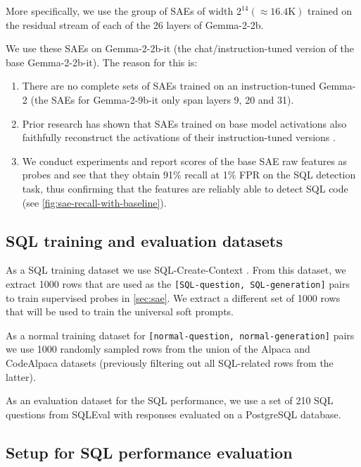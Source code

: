 \documentclass{article}
\let\tc\texttt
\begin{document}
More specifically, we use the group of SAEs of width $2^{14} (\approx16.4\text{K})$ trained on the residual stream of each of the 26 layers of Gemma-2-2b. 

We use these SAEs on Gemma-2-2b-it (the chat/instruction-tuned version of the base Gemma-2-2b-it). The reason for this is:
\begin{enumerate}
    \item There are no complete sets of SAEs trained on an instruction-tuned Gemma-2 (the SAEs for Gemma-2-9b-it only span layers 9, 20 and 31).
    \item Prior research has shown that SAEs trained on base model activations also faithfully reconstruct the activations of their instruction-tuned versions \citep{sae_finetuning, lieberum2024gemma}.
    \item We conduct experiments and report scores of the base SAE raw features as probes and see that they obtain 91\% recall at 1\% FPR on the SQL detection task, thus confirming that the features are reliably able to detect SQL code (see \cref{fig:sae-recall-with-baseline}).
\end{enumerate}

\subsection{SQL training and evaluation datasets}

As a SQL training dataset we use SQL-Create-Context \citep{b-mc2_2023_sql-create-context}. From this dataset, we extract 1000 rows that are used as the \tc{[SQL-question, SQL-generation]} pairs to train supervised probes in \cref{sec:sae}. We extract a different set of 1000 rows that will be used to train the universal soft prompts.

As a normal training dataset for \tc{[normal-question, normal-generation]} pairs we use 1000 randomly sampled rows from the union of the Alpaca \citep{alpaca} and CodeAlpaca \citep{codealpaca} datasets (previously filtering out all SQL-related rows from the latter).

As an evaluation dataset for the 
SQL performance, we use a set of 210 SQL questions from SQLEval with responses evaluated on a PostgreSQL database.

\subsection{Setup for SQL performance evaluation}
\end{document}

